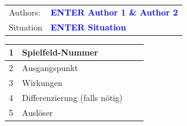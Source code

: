 \documentclass[12pt, a4paper]{article}
\newcommand{\authortext}{ENTER Author 1 \& Author 2}
\newcommand{\situation}{ENTER Situation}
\begin{document}
\begin{tabular}{l l} 
Authors: & \textbf{\textcolor{blue}{\large\authortext}}\\ 
Situation & \textbf{\textcolor{blue}{\large\situation}}
\end{tabular}

\vspace{1em}

\centerline{
	}

\vspace{1em}

\begin{table}[h!]
	\begin{tabularx}{\textwidth}{|p{0.3cm}|p{3.5cm}|X|p{0.3cm}|}
		\hline
		1 & Spielfeld-Nummer                       &  &  \\
		\hline
		2 & Ausgangspunkt                          &  &  \\
		\hline
		3 & Wirkungen                              &  &  \\
		\hline
		4 & Differenzierung \newline (falls nötig) &  &  \\
		\hline
		5 & Auslöser                               &  &  \\
		\hline
	\end{tabularx}
\end{table}
\end{document}
